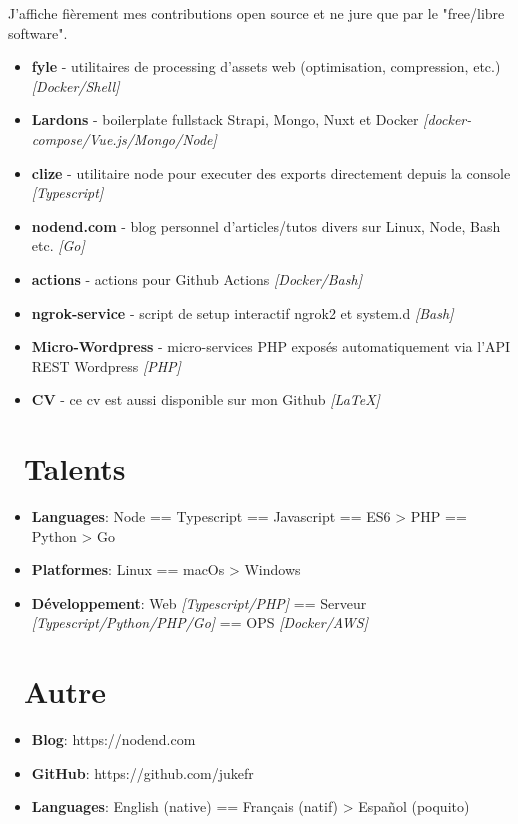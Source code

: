 \documentclass{resume}
\begin{document}
J'affiche fièrement mes contributions open source et ne jure que par le "free/libre software".
\begin{itemize}
  \item \textbf{fyle} - utilitaires de processing d'assets web (optimisation, compression, etc.) \textit{[Docker/Shell]}
  \item \textbf{Lardons} - boilerplate fullstack Strapi, Mongo, Nuxt et Docker \textit{[docker-compose/Vue.js/Mongo/Node]}
  \item \textbf{clize} - utilitaire node pour executer des exports directement depuis la console \textit{[Typescript]}
  \item \textbf{nodend.com} - blog personnel d'articles/tutos divers sur Linux, Node, Bash etc. \textit{[Go]}
  \item \textbf{actions} - actions pour Github Actions \textit{[Docker/Bash]}
  \item \textbf{ngrok-service} - script de setup interactif ngrok2 et system.d \textit{[Bash]}
  \item \textbf{Micro-Wordpress} - micro-services PHP exposés automatiquement via l'API REST Wordpress \textit{[PHP]}
  \item \textbf{CV} - ce cv est aussi disponible sur mon Github \textit{[LaTeX]}
\end{itemize}


\section{\faCogs\ Talents}
\begin{itemize}[parsep=0.5ex]
  \item \textbf{Languages}: Node == Typescript == Javascript == ES6 > PHP == Python > Go
  \item \textbf{Platformes}: Linux == macOs > Windows
  \item \textbf{Développement}: Web \textit{[Typescript/PHP]} == Serveur \textit{[Typescript/Python/PHP/Go]} == OPS \textit{[Docker/AWS]}
\end{itemize}

\section{\faInfo\ Autre}
\begin{itemize}[parsep=0.5ex]
  \item \textbf{Blog}: https://nodend.com
  \item \textbf{GitHub}: https://github.com/jukefr
  \item \textbf{Languages}: English (native) == Français (natif) > Español (poquito)
\end{itemize}

%
%
\end{document}
